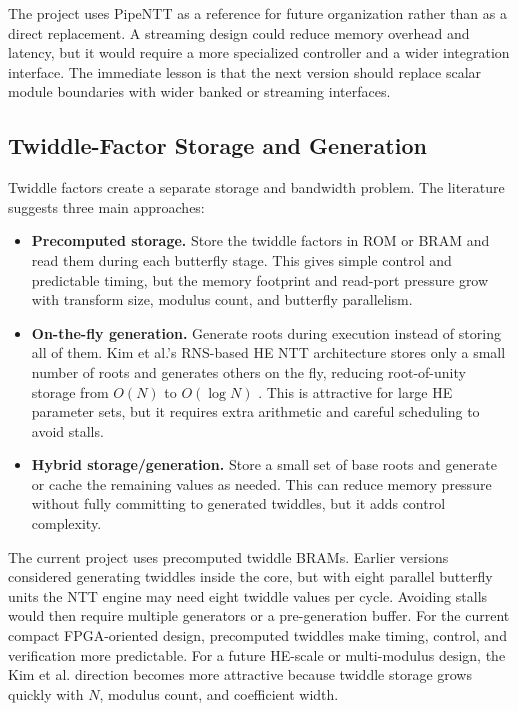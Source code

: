 \documentclass[a4paper, 12pt, titlepage]{article}
\begin{document}
The project uses PipeNTT as a reference for future organization rather
than as a direct replacement. A streaming design could reduce memory overhead
and latency, but it would require a more specialized controller and a wider
integration interface. The immediate lesson is that the next version should
replace scalar module boundaries with wider banked or streaming interfaces.

\subsection{Twiddle-Factor Storage and Generation}

Twiddle factors create a separate storage and bandwidth problem. The literature
suggests three main approaches:

\begin{itemize}
    \item \textbf{Precomputed storage.} Store the twiddle factors in ROM or BRAM
    and read them during each butterfly stage. This gives simple control and
    predictable timing, but the memory footprint and read-port pressure grow
    with transform size, modulus count, and butterfly parallelism.

    \item \textbf{On-the-fly generation.} Generate roots during execution
    instead of storing all of them. Kim et al.'s RNS-based HE NTT architecture
    stores only a small number of roots and generates others on the fly,
    reducing root-of-unity storage from \(O(N)\) to \(O(\log N)\)
    \cite{kim-rns-ntt}. This is attractive for large HE parameter sets, but it
    requires extra arithmetic and careful scheduling to avoid stalls.

    \item \textbf{Hybrid storage/generation.} Store a small set of base roots
    and generate or cache the remaining values as needed. This can reduce memory
    pressure without fully committing to generated twiddles, but it adds control
    complexity.
\end{itemize}

The current project uses precomputed twiddle BRAMs. Earlier versions considered
generating twiddles inside the core, but with eight parallel butterfly units the
NTT engine may need eight twiddle values per cycle. Avoiding stalls would then
require multiple generators or a pre-generation buffer. For the current compact
FPGA-oriented design, precomputed twiddles make timing, control, and
verification more predictable. For a future HE-scale or multi-modulus design,
the Kim et al. direction becomes more attractive because twiddle storage grows
quickly with \(N\), modulus count, and coefficient width.
\end{document}
